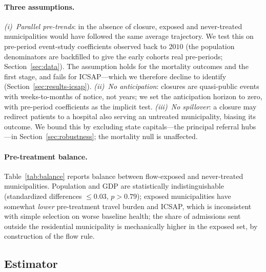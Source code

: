 \paragraph{Three assumptions.} \emph{(i)~Parallel pre-trends}: in the
absence of closure, exposed and never-treated municipalities would have
followed the same average trajectory. We test this on pre-period
event-study coefficients observed back to $2010$ (the population
denominators are backfilled to give the early cohorts real pre-periods;
Section~\ref{sec:data}). The assumption holds for the mortality outcomes
and the first stage, and fails for ICSAP---which we therefore decline to
identify (Section~\ref{sec:results-icsap}). \emph{(ii)~No anticipation}:
closures are quasi-public events with weeks-to-months of notice, not
years; we set the anticipation horizon to zero, with pre-period
coefficients as the implicit test. \emph{(iii)~No spillover}: a closure
may redirect patients to a hospital also serving an untreated
municipality, biasing its outcome. We bound this by excluding state
capitals---the principal referral hubs---in Section~\ref{sec:robustness};
the mortality null is unaffected.

\paragraph{Pre-treatment balance.} Table~\ref{tab:balance} reports
balance between flow-exposed and never-treated municipalities.
Population and GDP are statistically indistinguishable (standardized
differences $\le 0.03$, $p > 0.79$); exposed municipalities have somewhat
\emph{lower} pre-treatment travel burden and ICSAP, which is inconsistent
with simple selection on worse baseline health; the share of admissions sent outside the
residential municipality is mechanically higher in the exposed set, by
construction of the flow rule.



\subsection{Estimator}
\label{sec:method-estimator}

